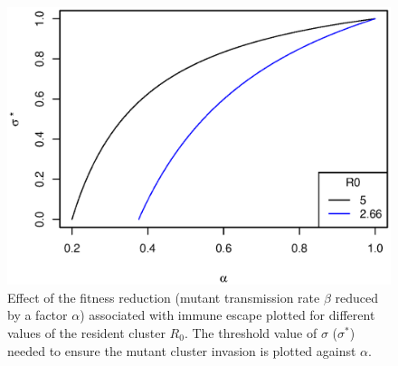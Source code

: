 \begin{figure}[!h]
  \center
  \includegraphics[width=0.5\linewidth]{graphs/article1/constraints.eps}
  \caption{Effect of the fitness reduction (mutant
    transmission rate $\beta$ reduced by a factor $\alpha$) associated
    with immune escape plotted for different values of the resident
    cluster $R_0$. The threshold value of $\sigma$ ($\sigma^*$) needed
    to ensure the mutant cluster invasion is plotted against
    $\alpha$.}
\label{fig:constraints}
\end{figure}


%
%


